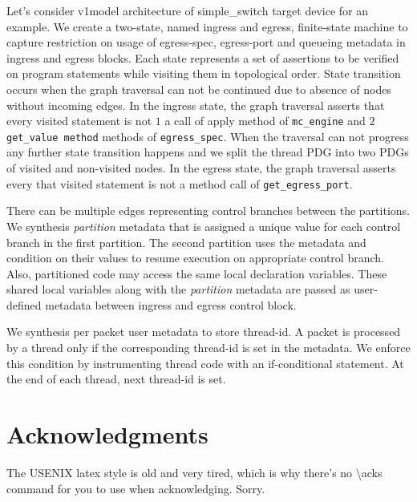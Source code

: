 Let's consider v1model architecture of simple\_switch target device for an example.
We create a two-state, named ingress and egress, finite-state machine to capture restriction on usage of egress-spec, egress-port and queueing metadata in ingress and egress blocks.
Each state represents a set of assertions to be verified on program statements while visiting them in topological order.
State transition occurs when the graph traversal can not be continued due to absence of nodes without incoming edges.
In the ingress state, the graph traversal asserts that every visited statement is not $1$ a call of apply method of \texttt{mc\_engine}  and $2$ \texttt{get\_value method} methods of \texttt{egress\_spec}.
When the traversal can not progress any further state transition happens and we split the thread PDG into two PDGs of visited and non-visited nodes.
In the egress state, the graph traversal asserts every that visited statement is not a method call of \texttt{get\_egress\_port}.

There can be multiple edges representing control branches between the partitions.
We synthesis \emph{partition} metadata that is assigned a unique value for each control branch in the first partition.
The second partition uses the metadata and condition on their values to resume execution on appropriate control branch.
Also, partitioned code may access the same local declaration variables.
These shared local variables along with the \emph{partition} metadata are passed as user-defined metadata between ingress and egress control block.

We synthesis per packet user metadata to store thread-id.
A packet is processed by a thread only if the corresponding thread-id is set in the metadata. 
We enforce this condition by instrumenting thread code with an if-conditional statement.
At the end of each thread, next thread-id is set.  





\section*{Acknowledgments}

The USENIX latex style is old and very tired, which is why
there's no \textbackslash{}acks command for you to use when
acknowledging. Sorry.

